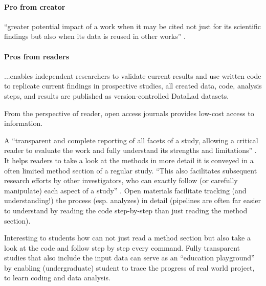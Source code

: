 \paragraph{Pro from creator}


``greater potential impact of a work when it may be cited not just for its
scientific findings but also when its data is reused in other works''
\citep{nichols2017best}.


\paragraph{Pros from readers}


...enables independent researchers to validate current results and use written
code to replicate current findings in prospective studies, all created data,
code, analysis steps, and results are published as version-controlled DataLad
\citep[\href{www.datalad.org}{datalad.org};][]{halchenko2021datalad} datasets.

%
From the perspective of reader, open access journals provides low-cost access to
information.

A ``transparent and complete reporting of all facets of a study, allowing a
critical reader to evaluate the work and fully understand its strengths and
limitations'' \citep{nichols2017best}.
%
It helps readers to take a look at the methods in more detail it is conveyed in
a often limited method section of a regular study.
%
``This also facilitates subsequent research efforts by other investigators, who
can exactly follow (or carefully manipulate) each aspect of a study''
\citep{nichols2017best}.
%
Open materials facilitate tracking (and understanding!) the process (esp.
analyzes) in detail (pipelines are often far easier to understand by reading the
code step-by-step than just reading the method section).

%
Interesting to students how can not just read a method section but also take a
look at the code and follow step by step every command.
%
Fully transparent studies that also include the input data can serve as an
``education playground'' by enabling (undergraduate) student to trace the
progress of real world project, to learn coding and data analysis.




